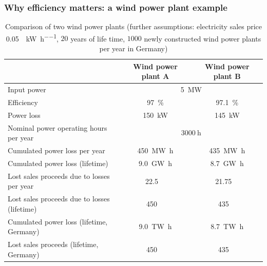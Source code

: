\begin{frame}[c]
	\frametitle{Why efficiency matters: a wind power plant example}
	\begin{table}
		\centering
		\begin{tabular}{lcc}
			\toprule
			& Wind power plant A & Wind power plant B \\
			\midrule
			Input power & \multicolumn{2}{c}{\SI{5}{\mega\watt}} \\
			Efficiency & \SI{97}{\percent} & \SI{97.1}{\percent}  \\
			Power loss & \SI{150}{\kilo\watt} & \SI{145}{\kilo\watt}\\
			\midrule
			Nominal power operating hours per year & \multicolumn{2}{c}{$\SI{3000}{\hour}$} \\
			Cumulated power loss per year & \SI{450}{\mega\watt\hour} & \SI{435}{\mega\watt\hour} \\
			Cumulated power loss (lifetime) & \SI{9.0}{\giga\watt\hour} & \SI{8.7}{\giga\watt\hour} \\
			\midrule
			Lost sales proceeds due to losses per year  & \SI{22.5}{\kilo\EUR} & \SI{21.75}{\kilo\EUR} \\
			Lost sales proceeds due to losses (lifetime)  & \SI{450}{\kilo\EUR} & \SI{435}{\kilo\EUR} \\
			\midrule
			Cumulated power loss (lifetime, Germany)  & \SI{9.0}{\tera\watt\hour} & \SI{8.7}{\tera\watt\hour} \\
			Lost sales proceeds (lifetime, Germany)  & \SI{450}{\mega\EUR} & \SI{435}{\mega\EUR} \\
			\bottomrule
		\end{tabular}
		\label{tab:efficiency_wind_power_example}
		\caption{Comparison of two wind power plants (further assumptions:  electricity sales price \SI[fraction-function=\nicefrac]{0.05}{\EUR\per\kilo\watt\per\hour}, $20$ years of life time, $\num{1000}$ newly constructed wind power plants per year in Germany)}
	\end{table}
\end{frame}
